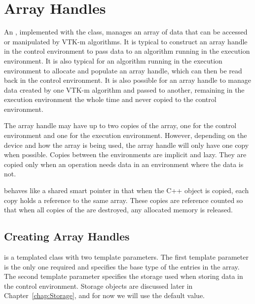 
\chapter{Array Handles}
\label{chap:ArrayHandle}


An , implemented with the 
class, manages an array of data that can be accessed or manipulated by VTK-m
algorithms. It is typical to construct an array handle in the control
environment to pass data to an algorithm running in the execution
environment. It is also typical for an algorithm running in the execution
environment to allocate and populate an array handle, which can then be
read back in the control environment. It is also possible for an array
handle to manage data created by one VTK-m algorithm and passed to another,
remaining in the execution environment the whole time and never copied to
the control environment.

\begin{didyouknow}
  The array handle may have up to two copies of the array, one for the
  control environment and one for the execution environment. However,
  depending on the device and how the array is being used, the array handle
  will only have one copy when possible. Copies between the environments
  are implicit and lazy. They are copied only when an operation needs data
  in an environment where the data is not.
\end{didyouknow}

 behaves like a shared smart pointer in that when the
C++ object is copied, each copy holds a reference to the same array. These
copies are reference counted so that when all copies of the
 are destroyed, any allocated memory is released.


\section{Creating Array Handles}

 is a templated class with two template parameters.
The first template parameter is the only one required and specifies the
base type of the entries in the array. The second template parameter
specifies the storage used when storing data in the control environment.
Storage objects are discussed later in Chapter~\ref{chap:Storage}, and for
now we will use the default value.

